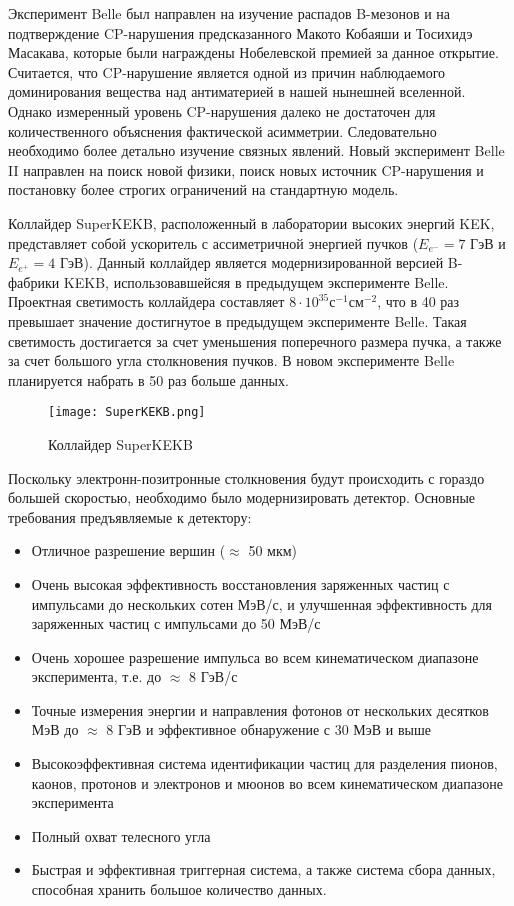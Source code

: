   Эксперимент Belle был направлен на изучение распадов B-мезонов и на подтверждение CP-нарушения предсказанного Макото Кобаяши и Тосихидэ Масакава, которые были награждены Нобелевской премией за данное открытие. Считается, что CP-нарушение является одной из причин наблюдаемого доминирования вещества над антиматерией в нашей нынешней вселенной. Однако измеренный уровень CP-нарушения далеко не достаточен для количественного объяснения фактической асимметрии. Следовательно необходимо более детально изучение связных явлений. Новый эксперимент Belle II направлен на поиск новой физики, поиск новых источник CP-нарушения и постановку более строгих ограничений на стандартную модель.\par 
Коллайдер SuperKEKB, расположенный в лаборатории высоких энергий KEK, представляет собой ускоритель с ассиметричной энергией пучков ($E_{e^-}=7$ ГэВ и $E_{e^+}=4$ ГэВ). Данный коллайдер является модернизированной версией B-фабрики KEKB, использовавшейсяя в предыдущем эксперименте Belle. Проектная светимость коллайдера составляет $8\cdot10^{35}$с$^{-1}$см$^{-2}$, что в 40 раз превышает значение достигнутое в предыдущем эксперименте Belle. Такая светимость достигается за счет уменьшения поперечного размера пучка, а также за счет большого угла столкновения пучков. В новом эксперименте Belle планируется набрать в 50 раз больше данных.\par
\begin{figure}[htp]
    \centering
    \texttt{[image: SuperKEKB.png]}
    \caption{Коллайдер SuperKEKB}
    \label{fig:galaxy}
\end{figure}
  Поскольку электронн-позитронные столкновения будут происходить с гораздо большей скоростью, необходимо было модернизировать детектор. Основные требования предъявляемые к детектору: 
\begin{itemize}
  \item Отличное разрешение вершин ($\approx$ 50 мкм)
  \item Очень высокая эффективность восстановления заряженных частиц с импульсами до нескольких сотен МэВ/с, и улучшенная эффективность для заряженных частиц с импульсами до 50 МэВ/с
  \item Очень хорошее разрешение импульса во всем кинематическом диапазоне эксперимента, т.е. до $\approx$ 8 ГэВ/с
  \item Точные измерения энергии и направления фотонов от нескольких десятков МэВ до $\approx$ 8 ГэВ и эффективное обнаружение с 30 МэВ и выше
  \item Высокоэффективная система идентификации частиц для разделения пионов, каонов, протонов и электронов и мюонов во всем кинематическом диапазоне эксперимента
  \item Полный охват телесного угла
  \item Быстрая и эффективная триггерная система, а также система сбора данных, способная хранить большое количество данных.
\end{itemize} \par
